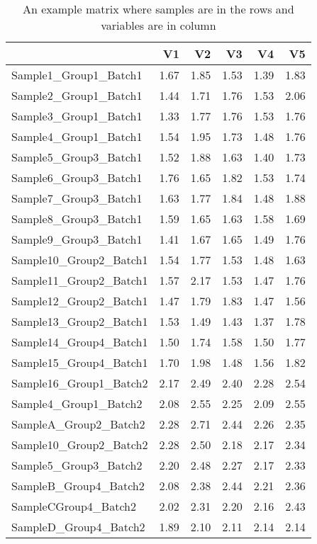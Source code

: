 \documentclass[
]{book}
\theoremstyle{definition}
\theoremstyle{definition}
\theoremstyle{definition}
\theoremstyle{remark}
\begin{document}
\begin{table}

\caption{\label{tab:tablesample}An example matrix where samples are in the rows and variables are in column}
\centering
\begin{tabular}[t]{l|r|r|r|r|r}
\hline
  & V1 & V2 & V3 & V4 & V5\\
\hline
Sample1\_Group1\_Batch1 & 1.67 & 1.85 & 1.53 & 1.39 & 1.83\\
\hline
Sample2\_Group1\_Batch1 & 1.44 & 1.71 & 1.76 & 1.53 & 2.06\\
\hline
Sample3\_Group1\_Batch1 & 1.33 & 1.77 & 1.76 & 1.53 & 1.76\\
\hline
Sample4\_Group1\_Batch1 & 1.54 & 1.95 & 1.73 & 1.48 & 1.76\\
\hline
Sample5\_Group3\_Batch1 & 1.52 & 1.88 & 1.63 & 1.40 & 1.73\\
\hline
Sample6\_Group3\_Batch1 & 1.76 & 1.65 & 1.82 & 1.53 & 1.74\\
\hline
Sample7\_Group3\_Batch1 & 1.63 & 1.77 & 1.84 & 1.48 & 1.88\\
\hline
Sample8\_Group3\_Batch1 & 1.59 & 1.65 & 1.63 & 1.58 & 1.69\\
\hline
Sample9\_Group3\_Batch1 & 1.41 & 1.67 & 1.65 & 1.49 & 1.76\\
\hline
Sample10\_Group2\_Batch1 & 1.54 & 1.77 & 1.53 & 1.48 & 1.63\\
\hline
Sample11\_Group2\_Batch1 & 1.57 & 2.17 & 1.53 & 1.47 & 1.76\\
\hline
Sample12\_Group2\_Batch1 & 1.47 & 1.79 & 1.83 & 1.47 & 1.56\\
\hline
Sample13\_Group2\_Batch1 & 1.53 & 1.49 & 1.43 & 1.37 & 1.78\\
\hline
Sample14\_Group4\_Batch1 & 1.50 & 1.74 & 1.58 & 1.50 & 1.77\\
\hline
Sample15\_Group4\_Batch1 & 1.70 & 1.98 & 1.48 & 1.56 & 1.82\\
\hline
Sample16\_Group1\_Batch2 & 2.17 & 2.49 & 2.40 & 2.28 & 2.54\\
\hline
Sample4\_Group1\_Batch2 & 2.08 & 2.55 & 2.25 & 2.09 & 2.55\\
\hline
SampleA\_Group2\_Batch2 & 2.28 & 2.71 & 2.44 & 2.26 & 2.35\\
\hline
Sample10\_Group2\_Batch2 & 2.28 & 2.50 & 2.18 & 2.17 & 2.34\\
\hline
Sample5\_Group3\_Batch2 & 2.20 & 2.48 & 2.27 & 2.17 & 2.33\\
\hline
SampleB\_Group4\_Batch2 & 2.08 & 2.38 & 2.44 & 2.21 & 2.36\\
\hline
SampleCGroup4\_Batch2 & 2.02 & 2.31 & 2.20 & 2.16 & 2.43\\
\hline
SampleD\_Group4\_Batch2 & 1.89 & 2.10 & 2.11 & 2.14 & 2.14\\
\hline
\end{tabular}
\end{table}
\end{document}
